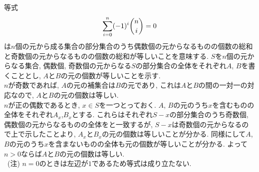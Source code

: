 \documentclass{jsarticle}
\begin{document}
等式
\begin{equation*}
	\sum_{i = 0}^n(-1)^i\dbinom{n}{i} = 0
\end{equation*}
は$n$個の元から成る集合の部分集合のうち偶数個の元からなるものの個数の総和と奇数個の元からなるものの個数の総和が等しいことを意味する. $S$を$n$個の元からなる集合, 偶数個, 奇数個の元からなる$S$の部分集合の全体をそれぞれ$A$, $B$を書くこととし, $A$と$B$の元の個数が等しいことを示す.\\
$n$が奇数であれば, $A$の元の補集合は$B$の元であり, これは$A$と$B$の間の一対一の対応なので, $A$と$B$の元の個数は等しい.\\
$n$が正の偶数であるとき, $x \in S$を一つとっておく. $A$, $B$の元のうち$x$を含むものの全体をそれぞれ$A_x$,$B_x$とする. これらはそれぞれ$S - {x}$の部分集合のうち奇数個, 偶数個の元からなるものの全体をと一致するが, $S - {x}$は奇数個の元からなるので上で示したことより, $A_x$と$B_x$の元の個数は等しいことが分かる. 同様にして$A$, $B$の元のうち$x$を含まないものの全体も元の個数が等しいことが分かる. よって$n > 0$ならば$A$と$B$の元の個数は等しい. \\
\footnotesize
\ (注) $n = 0$のときは左辺が$1$であるため等式は成り立たない.
\normalsize
\end{document}
